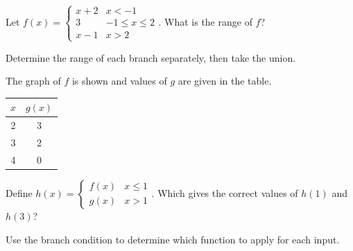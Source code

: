 \documentclass{ximera}
\begin{document}
\begin{problem}
Let $f(x) = \begin{cases} x+2 & x < -1 \\ 3 & -1 \leq x \leq 2 \\ x-1 & x > 2 \end{cases}$. What is the range of $f$?
\begin{hint}
Determine the range of each branch separately, then take the union.
\end{hint}
\begin{multipleChoice}
  \choice{$(-\infty,\infty)$}
  \choice{$(-\infty,3]$}
\end{multipleChoice}
\end{problem}

\begin{problem}
The graph of $f$ is shown and values of $g$ are given in the table.

\begin{center}
\quad
\begin{tabular}{c|c}
$x$ & $g(x)$ \\\hline
2 & 3 \\
3 & 2 \\
4 & 0
\end{tabular}
\end{center}

Define $h(x) = \begin{cases} f(x) & x \leq 1 \\ g(x) & x > 1 \end{cases}$. Which gives the correct values of $h(1)$ and $h(3)$?
\begin{hint}
Use the branch condition to determine which function to apply for each input.
\end{hint}
\begin{multipleChoice}
\end{multipleChoice}
\end{problem}
\end{document}
